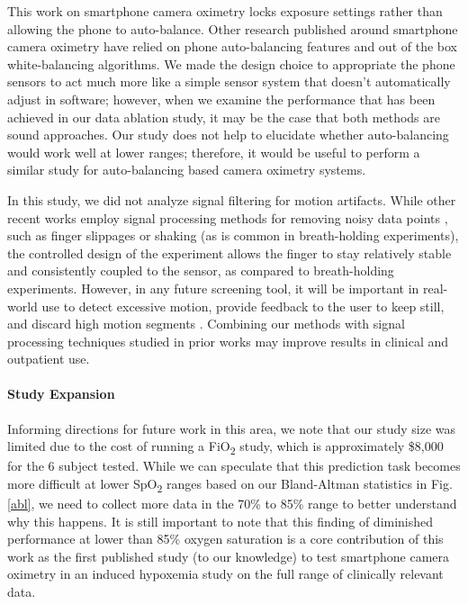 \documentclass[12pt]{article}
\begin{document}
This work on smartphone camera oximetry locks exposure settings rather than allowing the phone to auto-balance. Other research published around smartphone camera oximetry have relied on phone auto-balancing features and out of the box white-balancing algorithms. We made the design choice to appropriate the phone sensors to act much more like a simple sensor system that doesn't automatically adjust in software; however, when we examine the performance that has been achieved in our data ablation study, it may be the case that both methods are sound approaches. Our study does not help to elucidate whether auto-balancing would work well at lower ranges; therefore, it would be useful to perform a similar study for auto-balancing based camera oximetry systems.

In this study, we did not analyze signal filtering for motion artifacts. While other recent works employ signal processing methods for removing noisy data points \cite{bui2020smartphone,ding2018measuring}, such as finger slippages or shaking (as is common in breath-holding experiments), the controlled design of the experiment allows the finger to stay relatively stable and consistently coupled to the sensor, as compared to breath-holding experiments. However, in any future screening tool, it will be important in real-world use to detect excessive motion, provide feedback to the user to keep still, and discard high motion segments \cite{petterson2007effect}.  Combining our methods with signal processing techniques studied in prior works may improve results in clinical and outpatient use.

\paragraph*{Study Expansion}
Informing directions for future work in this area, we note that our study size was limited due to the cost of running a FiO\textsubscript{2} study, which is approximately \$8,000 for the 6 subject tested. While we can speculate that this prediction task becomes more difficult at lower SpO\textsubscript{2} ranges based on our Bland-Altman statistics in Fig. \ref{abl}, we need to collect more data in the 70\% to 85\% range to better understand why this happens. It is still important to note that this finding of diminished performance at lower than 85\% oxygen saturation is a core contribution of this work as the first published study (to our knowledge) to test smartphone camera oximetry in an induced hypoxemia study on the full range of clinically relevant data. 
\end{document}
